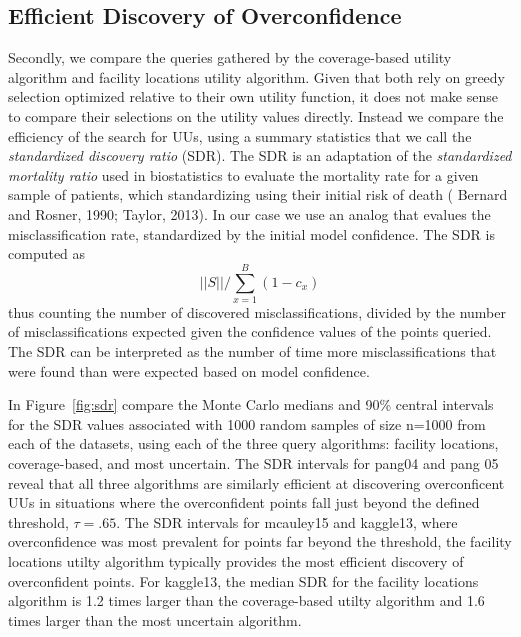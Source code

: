 \documentclass[letterpaper]{article} %
\newcommand{\km}[1]{{\color{red} #1}} %
\begin{document}
\subsection{Efficient Discovery of Overconfidence}

Secondly, we compare the queries gathered by the coverage-based utility algorithm and facility locations utility algorithm. Given that both rely on greedy selection optimized relative to their own utility function, it does not make sense to compare their selections on the utility values directly. Instead we compare the efficiency of the search for UUs, using a summary statistics that we call the \textit{standardized discovery ratio} (SDR). The SDR is an adaptation of the \textit{standardized mortality ratio} used in biostatistics to evaluate the mortality rate for a given sample of patients, which standardizing using their initial risk of death (\km{Bernard and Rosner, 1990; Taylor, 2013}). In our case we use an analog that evalues the misclassification rate, standardized by the initial model confidence. The SDR is computed as
$$ ||S|| / \sum_{x=1}^B(1- c_x) $$
thus counting the number of discovered misclassifications, divided by the number of misclassifications expected given the confidence values of the points queried. The SDR can be interpreted as the number of time more misclassifications that were found than were expected based on model confidence. 

\km{In Figure~\ref{fig:sdr} compare the Monte Carlo medians and 90\%  central intervals for the SDR values associated with 1000 random samples of size n=1000 from each of the datasets, using each of the three query algorithms: facility locations, coverage-based, and most uncertain. The SDR intervals for pang04 and pang 05 reveal that all three algorithms are similarly efficient at discovering overconficent UUs in situations where the overconfident points fall just beyond the defined threshold, $\tau = .65$. The SDR intervals for mcauley15 and kaggle13, where overconfidence was most prevalent for points far beyond the threshold, the facility locations utilty algorithm typically provides the most efficient discovery of overconfident points. For kaggle13, the median SDR for the facility locations algorithm is 1.2 times larger than the coverage-based utilty algorithm and 1.6 times larger than the most uncertain algorithm.}
\end{document}
